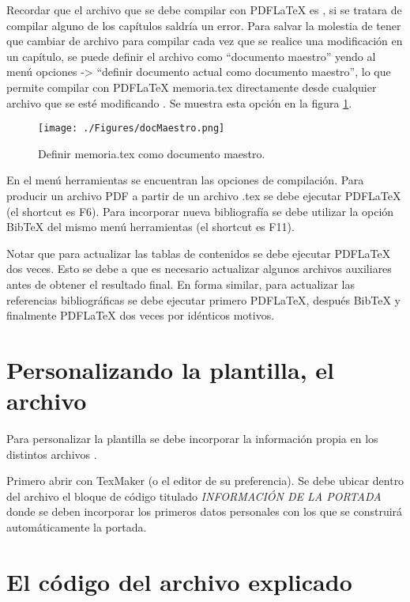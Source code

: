 Recordar que el archivo que se debe compilar con PDFLaTeX es , si se tratara de compilar alguno de los capítulos saldría un error.  Para salvar la molestia de tener que cambiar de archivo para compilar cada vez que se realice una modificación en un capítulo, se puede definir el archivo  como ``documento maestro'' yendo al menú opciones -> ``definir documento actual como documento maestro'', lo que permite compilar con PDFLaTeX memoria.tex directamente desde cualquier archivo que se esté modificando . Se muestra esta opción en la figura \ref{fig:docMaestro}.

\begin{figure}[h]
	\centering
	\texttt{[image: ./Figures/docMaestro.png]}
	\caption{Definir memoria.tex como documento maestro.}
	\label{fig:docMaestro}
\end{figure}

En el menú herramientas se encuentran las opciones de compilación.  Para producir un archivo PDF a partir de un archivo .tex se debe ejecutar PDFLaTeX (el shortcut es F6). Para incorporar nueva bibliografía se debe utilizar la opción BibTeX del mismo menú herramientas (el shortcut es F11).

Notar que para actualizar las tablas de contenidos se debe ejecutar PDFLaTeX dos veces.  Esto se debe a que es necesario actualizar algunos archivos auxiliares antes de obtener el resultado final.  En forma similar, para actualizar las referencias bibliográficas se debe ejecutar primero PDFLaTeX, después BibTeX y finalmente PDFLaTeX dos veces por idénticos motivos.

\section{Personalizando la plantilla, el archivo }
\label{sec:FillingFile}

Para personalizar la plantilla se debe incorporar la información propia en los distintos archivos . 

Primero abrir  con TexMaker (o el editor de su preferencia). Se debe ubicar dentro del archivo el bloque de código titulado \emph{INFORMACIÓN DE LA PORTADA} donde se deben incorporar los primeros datos personales con los que se construirá automáticamente la portada.



\section{El código del archivo  explicado}

